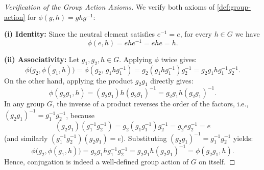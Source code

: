\begin{content}

\begin{proof}[Verification of the Group Action Axioms]
We verify both axioms of \cref{def:group-action} for $\phi(g, h) = g h g^{-1}$:

\textbf{(i) Identity:} Since the neutral element satisfies $e^{-1} = e$, for every $h \in G$ we have
\[
\phi(e, h) = e h e^{-1} = e h e = h.
\]

\textbf{(ii) Associativity:} Let $g_1, g_2, h \in G$. Applying $\phi$ twice gives:
\[
\phi\bigl(g_2, \phi(g_1, h)\bigr) = \phi(g_2,\, g_1 h g_1^{-1}) = g_2 (g_1 h g_1^{-1}) g_2^{-1} = g_2 g_1 h g_1^{-1} g_2^{-1}.
\]
On the other hand, applying the product $g_2 g_1$ directly gives:
\[
\phi(g_2 g_1, h) = (g_2 g_1) h (g_2 g_1)^{-1} = g_2 g_1 h (g_2 g_1)^{-1}.
\]
In any group $G$, the inverse of a product reverses the order of the factors, i.e., $(g_2 g_1)^{-1} = g_1^{-1} g_2^{-1}$, because
\[
(g_2 g_1)(g_1^{-1} g_2^{-1}) = g_2 (g_1 g_1^{-1}) g_2^{-1} = g_2 e g_2^{-1} = e
\]
(and similarly $(g_1^{-1} g_2^{-1})(g_2 g_1) = e$). Substituting $(g_2 g_1)^{-1} = g_1^{-1} g_2^{-1}$ yields:
\[
\phi\bigl(g_2, \phi(g_1, h)\bigr) = g_2 g_1 h g_1^{-1} g_2^{-1} = g_2 g_1 h (g_2 g_1)^{-1} = \phi(g_2 g_1, h).
\]
Hence, conjugation is indeed a well-defined group action of $G$ on itself.
\end{proof}
\end{content}

